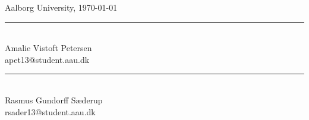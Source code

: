 \vspace{0.5\baselineskip}\hfill Aalborg University, \today
\vfill


\vspace{1.5\baselineskip}
\begin{minipage}[b]{0.45\textwidth}
 \centering
 \rule{\textwidth}{0.45pt}\\
  Amalie Vistoft Petersen\\
 {\footnotesize apet13@student.aau.dk}
\end{minipage}
\vspace{1.5\baselineskip}
\hfill
\begin{minipage}[b]{0.45\textwidth}
 \centering
 \rule{\textwidth}{0.45pt}\\
  Rasmus Gundorff Sæderup\\
 {\footnotesize rsader13@student.aau.dk}
\end{minipage}

\noindent{}

